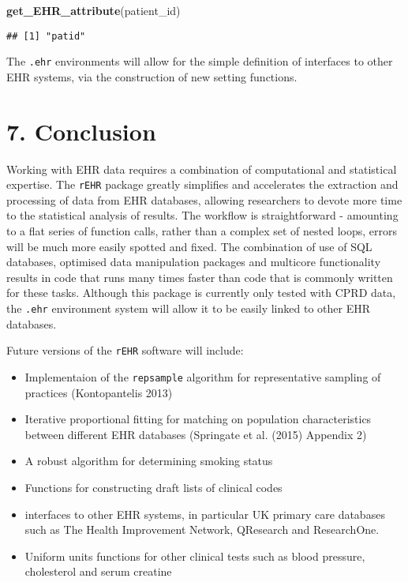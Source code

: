 \documentclass[]{article}
\newenvironment{Shaded}{\begin{snugshade}}{\end{snugshade}}
\newcommand{\KeywordTok}[1]{\textcolor[rgb]{0.13,0.29,0.53}{\textbf{{#1}}}}
\newcommand{\NormalTok}[1]{{#1}}
\begin{document}
\begin{Shaded}
\begin{Highlighting}[]
\KeywordTok{get_EHR_attribute}\NormalTok{(patient_id)}
\end{Highlighting}
\end{Shaded}

\begin{verbatim}
## [1] "patid"
\end{verbatim}

The \texttt{.ehr} environments will allow for the simple definition of
interfaces to other EHR systems, via the construction of new setting
functions.

\section{7. Conclusion}\label{conclusion}

Working with EHR data requires a combination of computational and
statistical expertise. The \texttt{rEHR} package greatly simplifies and
accelerates the extraction and processing of data from EHR databases,
allowing researchers to devote more time to the statistical analysis of
results. The workflow is straightforward - amounting to a flat series of
function calls, rather than a complex set of nested loops, errors will
be much more easily spotted and fixed. The combination of use of SQL
databases, optimised data manipulation packages and multicore
functionality results in code that runs many times faster than code that
is commonly written for these tasks. Although this package is currently
only tested with CPRD data, the \texttt{.ehr} environment system will
allow it to be easily linked to other EHR databases.

Future versions of the \texttt{rEHR} software will include:

\begin{itemize}
\itemsep1pt\parskip0pt
\item
  Implementaion of the \texttt{repsample} algorithm for representative
  sampling of practices (Kontopantelis 2013)
\item
  Iterative proportional fitting for matching on population
  characteristics between different EHR databases (Springate et al.
  (2015) Appendix 2)
\item
  A robust algorithm for determining smoking status
\item
  Functions for constructing draft lists of clinical codes
\item
  interfaces to other EHR systems, in particular UK primary care
  databases such as The Health Improvement Network, QResearch and
  ResearchOne.
\item
  Uniform units functions for other clinical tests such as blood
  pressure, cholesterol and serum creatine
\end{itemize}
\end{document}
